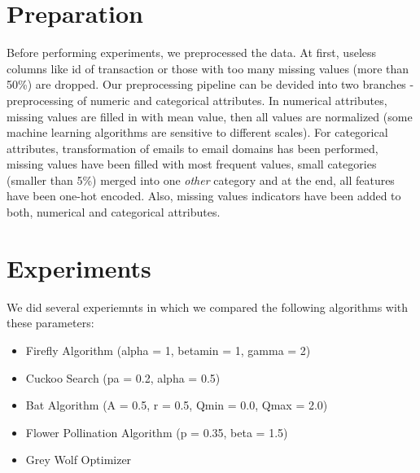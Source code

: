 \documentclass[runningheads]{llncs}
\begin{document}



\section{Preparation}

Before performing experiments, we preprocessed the data. At first, useless columns like id of transaction or those with too many missing values (more than 50\%) are dropped. Our preprocessing pipeline can be devided into two branches - preprocessing of numeric and categorical attributes. In numerical attributes, missing values are filled in with mean value, then all values are normalized (some machine learning algorithms are sensitive to different scales). For categorical attributes, transformation of emails to email domains has been performed, missing values have been filled with most frequent values, small categories (smaller than 5\%) merged into one \textit{other} category and at the end, all features have been one-hot encoded. Also, missing values indicators have been added to both, numerical and categorical attributes.



\section{Experiments}

We did several experiemnts in which we compared the following algorithms with these parameters:

\begin{itemize}
	\item Firefly Algorithm (alpha = 1, betamin = 1, gamma = 2)
	\item Cuckoo Search (pa = 0.2, alpha = 0.5)
	\item Bat Algorithm (A = 0.5, r = 0.5, Qmin = 0.0, Qmax = 2.0)
	\item Flower Pollination Algorithm (p = 0.35, beta = 1.5)
	\item Grey Wolf Optimizer
\end{itemize}
\end{document}
